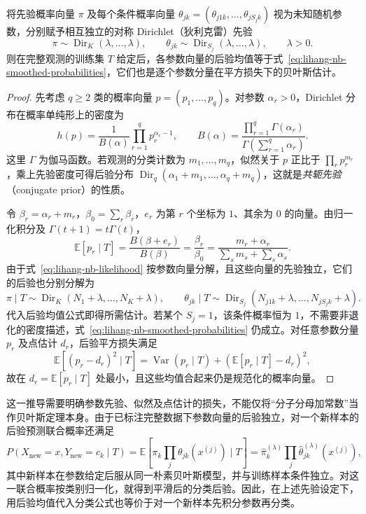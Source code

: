 \begin{proposition}
\label{prop:lihang-nb-dirichlet-estimation}
将先验概率向量 $\pi$ 及每个条件概率向量 $\theta_{jk}=(\theta_{j1k},\ldots,\theta_{jS_jk})$ 视为未知随机参数，分别赋予相互独立的对称 Dirichlet（狄利克雷）先验
\[
    \pi\sim\operatorname{Dir}_K(\lambda,\ldots,\lambda),\qquad
    \theta_{jk}\sim\operatorname{Dir}_{S_j}(\lambda,\ldots,\lambda),\qquad\lambda>0.
\]
则在完整观测的训练集 $T$ 给定后，各参数向量的后验均值等于式~\eqref{eq:lihang-nb-smoothed-probabilities}，它们也是逐个参数分量在平方损失下的贝叶斯估计。
\end{proposition}

\begin{proof}
先考虑 $q\geq2$ 类的概率向量 $p=(p_1,\ldots,p_q)$。对参数 $\alpha_r>0$，Dirichlet 分布在概率单纯形上的密度为
\[
    h(p)=\frac{1}{B(\alpha)}\prod_{r=1}^{q}p_r^{\alpha_r-1},\qquad
    B(\alpha)=\frac{\prod_{r=1}^{q}\Gamma(\alpha_r)}{\Gamma(\sum_{r=1}^{q}\alpha_r)}.
\]
这里 $\Gamma$ 为伽马函数。若观测的分类计数为 $m_1,\ldots,m_q$，似然关于 $p$ 正比于 $\prod_r p_r^{m_r}$，乘上先验密度可得后验分布 $\operatorname{Dir}_q(\alpha_1+m_1,\ldots,\alpha_q+m_q)$，这就是\emph{共轭先验}（conjugate prior）的性质。

令 $\beta_r=\alpha_r+m_r$，$\beta_0=\sum_r\beta_r$，$e_r$ 为第 $r$ 个坐标为 $1$、其余为 $0$ 的向量。由归一化积分及 $\Gamma(t+1)=t\Gamma(t)$，
\[
    \mathbb{E}[p_r\mid T]
    =\frac{B(\beta+e_r)}{B(\beta)}=\frac{\beta_r}{\beta_0}
    =\frac{m_r+\alpha_r}{\sum_s m_s+\sum_s\alpha_s}.
\]
由于式~\eqref{eq:lihang-nb-likelihood} 按参数向量分解，且这些向量的先验独立，它们的后验也分别分解为
\[
    \pi\mid T\sim\operatorname{Dir}_K(N_1+\lambda,\ldots,N_K+\lambda),\qquad
    \theta_{jk}\mid T\sim\operatorname{Dir}_{S_j}(N_{j1k}+\lambda,\ldots,N_{jS_jk}+\lambda).
\]
代入后验均值公式即得所需估计。若某个 $S_j=1$，该条件概率恒为 $1$，不需要非退化的密度描述，式~\eqref{eq:lihang-nb-smoothed-probabilities} 仍成立。对任意参数分量 $p_r$ 及点估计 $d_r$，后验平方损失满足
\[
    \mathbb{E}[(p_r-d_r)^2\mid T]
    =\operatorname{Var}(p_r\mid T)+(\mathbb{E}[p_r\mid T]-d_r)^2,
\]
故在 $d_r=\mathbb{E}[p_r\mid T]$ 处最小，且这些均值合起来仍是规范化的概率向量。
\end{proof}

这一推导需要明确参数先验、似然及点估计的损失，不能仅将“分子分母加常数”当作贝叶斯定理本身。由于已标注完整数据下参数向量的后验独立，对一个新样本的后验预测联合概率还满足
\[
    P(X_{\mathrm{new}}=x,Y_{\mathrm{new}}=c_k\mid T)
    =\mathbb{E}[\pi_k\prod_j\theta_{jk}(x^{(j)})\mid T]
    =\widehat\pi_k^{(\lambda)}\prod_j\widehat\theta_{jk}^{(\lambda)}(x^{(j)}),
\]
其中新样本在参数给定后服从同一朴素贝叶斯模型，并与训练样本条件独立。对这一联合概率按类别归一化，就得到平滑后的分类后验。因此，在上述先验设定下，用后验均值代入分类公式也等价于对一个新样本先积分参数再分类。

